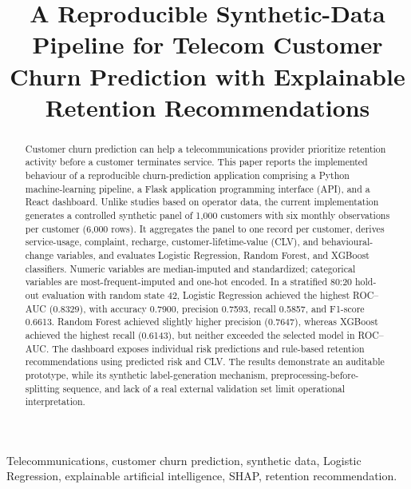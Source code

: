 \documentclass[conference]{IEEEtran}
\begin{document}
\title{A Reproducible Synthetic-Data Pipeline for Telecom Customer Churn Prediction with Explainable Retention Recommendations}

\author{
}

\maketitle

\begin{abstract}
Customer churn prediction can help a telecommunications provider prioritize retention activity before a customer terminates service. This paper reports the implemented behaviour of a reproducible churn-prediction application comprising a Python machine-learning pipeline, a Flask application programming interface (API), and a React dashboard. Unlike studies based on operator data, the current implementation generates a controlled synthetic panel of 1,000 customers with six monthly observations per customer (6,000 rows). It aggregates the panel to one record per customer, derives service-usage, complaint, recharge, customer-lifetime-value (CLV), and behavioural-change variables, and evaluates Logistic Regression, Random Forest, and XGBoost classifiers. Numeric variables are median-imputed and standardized; categorical variables are most-frequent-imputed and one-hot encoded. In a stratified 80:20 hold-out evaluation with random state 42, Logistic Regression achieved the highest ROC--AUC (0.8329), with accuracy 0.7900, precision 0.7593, recall 0.5857, and F1-score 0.6613. Random Forest achieved slightly higher precision (0.7647), whereas XGBoost achieved the highest recall (0.6143), but neither exceeded the selected model in ROC--AUC. The dashboard exposes individual risk predictions and rule-based retention recommendations using predicted risk and CLV. The results demonstrate an auditable prototype, while its synthetic label-generation mechanism, preprocessing-before-splitting sequence, and lack of a real external validation set limit operational interpretation.
\end{abstract}

\begin{IEEEkeywords}
Telecommunications, customer churn prediction, synthetic data, Logistic Regression, explainable artificial intelligence, SHAP, retention recommendation.
\end{IEEEkeywords}
\end{document}
